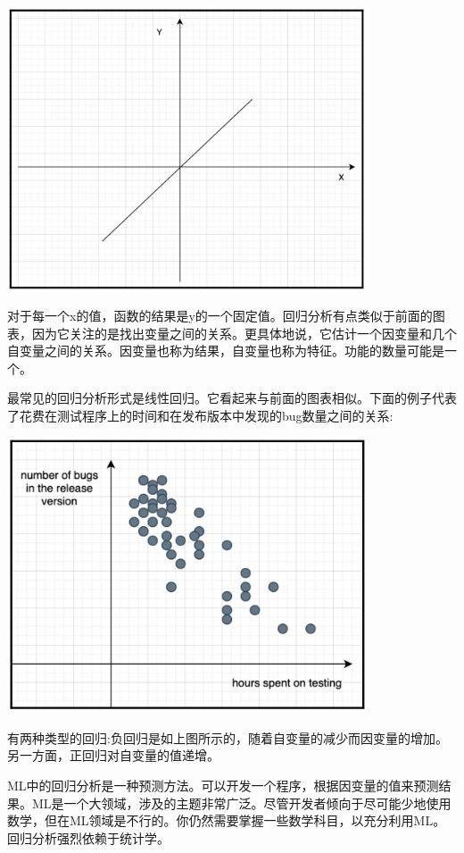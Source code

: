 \begin{center}
	\includegraphics[width=0.8\textwidth]{content/Section-3/Chapter-15/12}
\end{center}

对于每一个x的值，函数的结果是y的一个固定值。回归分析有点类似于前面的图表，因为它关注的是找出变量之间的关系。更具体地说，它估计一个因变量和几个自变量之间的关系。因变量也称为结果，自变量也称为特征。功能的数量可能是一个。 \par
最常见的回归分析形式是线性回归。它看起来与前面的图表相似。下面的例子代表了花费在测试程序上的时间和在发布版本中发现的bug数量之间的关系: \par

\begin{center}
	\includegraphics[width=0.8\textwidth]{content/Section-3/Chapter-15/13}
\end{center}

有两种类型的回归:负回归是如上图所示的，随着自变量的减少而因变量的增加。另一方面，正回归对自变量的值递增。 \par
ML中的回归分析是一种预测方法。可以开发一个程序，根据因变量的值来预测结果。ML是一个大领域，涉及的主题非常广泛。尽管开发者倾向于尽可能少地使用数学，但在ML领域是不行的。你仍然需要掌握一些数学科目，以充分利用ML。回归分析强烈依赖于统计学。 \par

